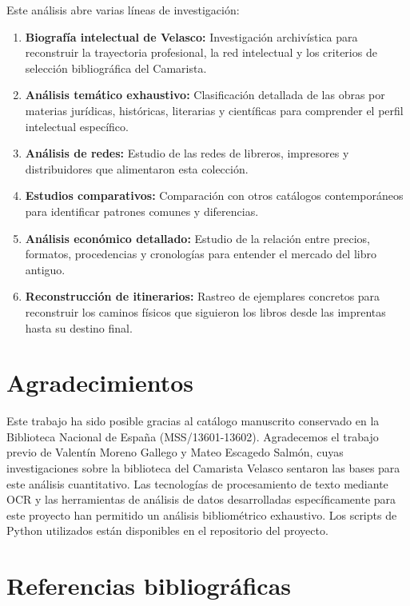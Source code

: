 \documentclass[12pt,a4paper]{article}
\begin{document}
Este análisis abre varias líneas de investigación:

\begin{enumerate}
    \item \textbf{Biografía intelectual de Velasco:} Investigación archivística para reconstruir la trayectoria profesional, la red intelectual y los criterios de selección bibliográfica del Camarista.

    \item \textbf{Análisis temático exhaustivo:} Clasificación detallada de las obras por materias jurídicas, históricas, literarias y científicas para comprender el perfil intelectual específico.

    \item \textbf{Análisis de redes:} Estudio de las redes de libreros, impresores y distribuidores que alimentaron esta colección.

    \item \textbf{Estudios comparativos:} Comparación con otros catálogos contemporáneos para identificar patrones comunes y diferencias.

    \item \textbf{Análisis económico detallado:} Estudio de la relación entre precios, formatos, procedencias y cronologías para entender el mercado del libro antiguo.

    \item \textbf{Reconstrucción de itinerarios:} Rastreo de ejemplares concretos para reconstruir los caminos físicos que siguieron los libros desde las imprentas hasta su destino final.
\end{enumerate}

\section{Agradecimientos}

Este trabajo ha sido posible gracias al catálogo manuscrito conservado en la Biblioteca Nacional de España (MSS/13601-13602). Agradecemos el trabajo previo de Valentín Moreno Gallego y Mateo Escagedo Salmón, cuyas investigaciones sobre la biblioteca del Camarista Velasco sentaron las bases para este análisis cuantitativo. Las tecnologías de procesamiento de texto mediante OCR y las herramientas de análisis de datos desarrolladas específicamente para este proyecto han permitido un análisis bibliométrico exhaustivo. Los scripts de Python utilizados están disponibles en el repositorio del proyecto.

\section{Referencias bibliográficas}
\end{document}
